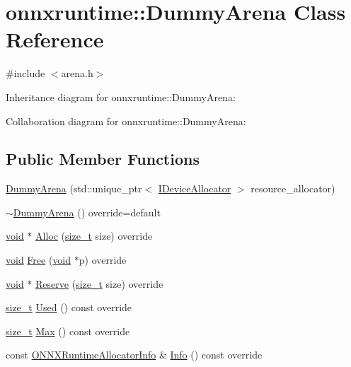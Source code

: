 \hypertarget{classonnxruntime_1_1DummyArena}{}\section{onnxruntime\+:\+:Dummy\+Arena Class Reference}
\label{classonnxruntime_1_1DummyArena}


{\ttfamily \#include $<$arena.\+h$>$}



Inheritance diagram for onnxruntime\+:\+:Dummy\+Arena\+:


Collaboration diagram for onnxruntime\+:\+:Dummy\+Arena\+:
\subsection*{Public Member Functions}
\begin{DoxyCompactItemize}
\item 
\mbox{\hyperlink{classonnxruntime_1_1DummyArena_adeb5cc41b1ce4bfc17f93467fc616558}{Dummy\+Arena}} (std\+::unique\+\_\+ptr$<$ \mbox{\hyperlink{classonnxruntime_1_1IDeviceAllocator}{I\+Device\+Allocator}} $>$ resource\+\_\+allocator)
\item 
\mbox{\hyperlink{classonnxruntime_1_1DummyArena_a1c1da9245b5e19a708e86390ae5e1d35}{$\sim$\+Dummy\+Arena}} () override=default
\item 
\mbox{\hyperlink{mlasi_8h_a88f941d423cb2a819b70a1358982b1a6}{void}} $\ast$ \mbox{\hyperlink{classonnxruntime_1_1DummyArena_a44c2bb22792ce63e5d7bfa4b3e03d968}{Alloc}} (\mbox{\hyperlink{mlasi_8h_a503efbc1c6e50825320ad909366b78ab}{size\+\_\+t}} size) override
\item 
\mbox{\hyperlink{mlasi_8h_a88f941d423cb2a819b70a1358982b1a6}{void}} \mbox{\hyperlink{classonnxruntime_1_1DummyArena_a58196d32ed10a9d9aba3681457ec982d}{Free}} (\mbox{\hyperlink{mlasi_8h_a88f941d423cb2a819b70a1358982b1a6}{void}} $\ast$p) override
\item 
\mbox{\hyperlink{mlasi_8h_a88f941d423cb2a819b70a1358982b1a6}{void}} $\ast$ \mbox{\hyperlink{classonnxruntime_1_1DummyArena_a8bfa97292cc0bac6cc6c18e913bdcb4c}{Reserve}} (\mbox{\hyperlink{mlasi_8h_a503efbc1c6e50825320ad909366b78ab}{size\+\_\+t}} size) override
\item 
\mbox{\hyperlink{mlasi_8h_a503efbc1c6e50825320ad909366b78ab}{size\+\_\+t}} \mbox{\hyperlink{classonnxruntime_1_1DummyArena_a8d52981f5c7d9c0b098c27405481bc0a}{Used}} () const override
\item 
\mbox{\hyperlink{mlasi_8h_a503efbc1c6e50825320ad909366b78ab}{size\+\_\+t}} \mbox{\hyperlink{classonnxruntime_1_1DummyArena_ae4edcff60bded3201a9852c6bc935276}{Max}} () const override
\item 
const \mbox{\hyperlink{structONNXRuntimeAllocatorInfo}{O\+N\+N\+X\+Runtime\+Allocator\+Info}} \& \mbox{\hyperlink{classonnxruntime_1_1DummyArena_a7f85a06ef904b9fe007e76d18a8d68a9}{Info}} () const override
\end{DoxyCompactItemize}
